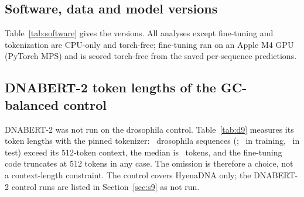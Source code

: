 \documentclass[journal,onecolumn,10pt,letterpaper]{IEEEtran}
\newcommand{\tasku}{\textunderscore\allowbreak}
\DeclareRobustCommand{\task}[1]{{\normalfont\ttfamily\upshape\let\_\tasku #1}}
\begin{document}


\subsection{Software, data and model versions}
Table~\ref{tab:software} gives the versions. All analyses except fine-tuning and tokenization are
CPU-only and torch-free; fine-tuning ran on an Apple M4 GPU (PyTorch MPS) and is scored torch-free
from the saved per-sequence predictions.



\subsection{DNABERT-2 token lengths of the GC-balanced control}\label{sec:s1tok}
DNABERT-2 was not run on the \task{drosophila} control. Table~\ref{tab:d9} measures its token
lengths with the pinned tokenizer: \smDNineN\ \task{drosophila} sequences (\smDNinePct; \smDNineTrain\
in training, \smDNineTest\ in test) exceed its 512-token context, the median is \smDNineMedTok\ tokens,
and the fine-tuning code truncates at 512 tokens in any case. The omission is therefore a choice, not
a context-length constraint. The control covers HyenaDNA only; the DNABERT-2 control runs are listed
in Section~\ref{sec:s9} as not run.


\end{document}

